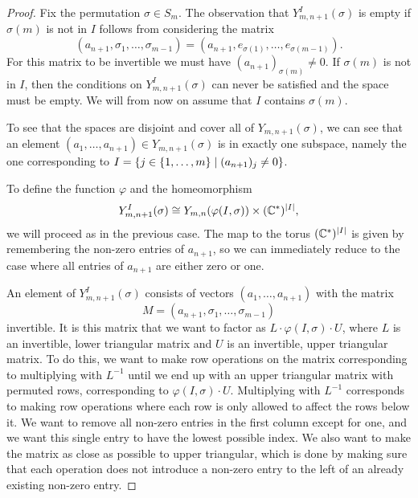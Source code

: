 \begin{proof}
  Fix the permutation $\sigma \in S_m$. The observation that
  $Y^I_{m,n+1}(\sigma)$ is empty 
  if $\sigma(m)$ is not in $I$ follows from considering the matrix
  \[ (a_{n+1},\sigma_1,\dots,\sigma_{m-1}) =
  (a_{n+1},e_{\sigma(1)},\dots,e_{\sigma(m-1)}). \]
  For this matrix to be invertible we must have $(a_{n+1})_{\sigma(m)}
  \neq 0$. If $\sigma(m)$ is not in $I$, then the conditions on
  $Y^{I}_{m,n+1}(\sigma)$ can never be satisfied and the space must be
  empty. We will from now on assume that $I$ contains $\sigma(m)$.
  
  To see that the spaces are disjoint and cover all of
  $Y_{m,n+1}(\sigma)$, we can see that an element
  $(a_1,\dots,a_{n+1})\in Y_{m,n+1}(\sigma)$ is in exactly one
  subspace, namely the one corresponding to $I = \left\{  j \in
    \left\{ 1,\dots,m \right\} \mid (a_{n+1})_j \neq 0 \right\}$.
  
  To define the function $\varphi$ and the homeomorphism
  \[ Y^I_{m,n+1}(\sigma) \cong Y_{m,n}(\varphi(I,\sigma))\times
  (\mathbb{C}^*)^{\left| I \right|}, \]
  we will proceed as in the previous case. The map to the torus
  $(\mathbb{C}^*)^{\left| I \right|}$ is given by remembering the non-zero entries of
  $a_{n+1}$, so we can immediately reduce to the case where all
  entries of $a_{n+1}$ are either zero or one.

  An element of $Y_{m,n+1}^I(\sigma)$ consists of vectors
  $(a_1,\dots,a_{n+1})$ with the matrix
  \[ M = (a_{n+1},\sigma_1,\dots,\sigma_{m-1}) \]
  invertible. It is this matrix that we want to factor as
  $L\cdot \varphi(I,\sigma)\cdot U$, where $L$ is an invertible, lower
  triangular matrix and $U$ is an invertible, upper triangular
  matrix. To do this, we want to make row operations on the matrix
  corresponding to multiplying with $L^{-1}$ until we end up with an
  upper triangular matrix with permuted rows, corresponding to
  $\varphi(I,\sigma) \cdot U$. Multiplying with $L^{-1}$ corresponds
  to making row operations where each row is only allowed to affect
  the rows below it. We want to remove all non-zero entries in the
  first column except for one, and we want this single entry to have
  the lowest possible index. We also want to make the matrix as close
  as possible to upper triangular, which is done by making sure that
  each operation does not introduce a non-zero entry to the left of an
  already existing non-zero entry.
  

\end{proof}
